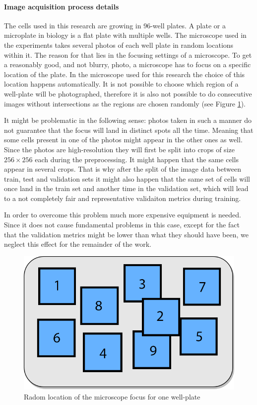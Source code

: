 \paragraph{Image acquisition process details} 
    The cells used in this research are growing in 96-well plates. A plate or a microplate in biology is a flat plate with multiple wells. The microscope used in the experiments takes several photos of each well plate in random locations within it. The reason for that lies in the focusing settings of a  microscope. To get a reasonably good, and not blurry, photo, a microscope has to focus on a specific location of the plate. In the microscope used for this research the choice of this location happens automatically. It is not possible to choose which region of a well-plate will be photographed, therefore it is also not possible to do consecutive images without intersections as the regions are chosen randomly (see Figure \ref{fig:random-dic}). 
    
    It might be problematic in the following sense: photos taken in such a manner do not guarantee that the focus will land in distinct spots all the time. Meaning that some cells present in one of the photos might appear in the other ones as well. Since the photos are high-resolution they will first be split into crops of size $256 \times 256$ each during the preprocessing. It might happen that the same cells appear in several crops. That is why after the split of the image data between train, test and validation sets it might also happen that the same set of cells will once land in the train set and another time in the validation set, which will lead to a not completely fair and representative validaiton metrics during training.
    
    In order to overcome this problem much more expensive equipment is needed. Since it does not cause fundamental problems in this case, except for the fact that the validation metrics might be lower than what they should have been, we neglect this effect for the remainder of the work. 
    
    \begin{figure}[htb]
        \begin{center}
            \includegraphics[width=0.3\linewidth]{bilder/dic-random.png}
            \caption{Radom location of the microscope focus for one well-plate}\label{fig:random-dic}
        \end{center}
    \end{figure}